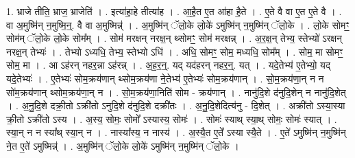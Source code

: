 \documentclass[17pt]{extarticle}
\begin{document}
1. भ्राजे तीति॒ भ्राज॒ भ्राजेति॑ । . इत्या॑हा॒हे तीत्या॑ह । . आ॒है॒त ए॒त आ॑हा है॒ते । . ए॒ते वै वा ए॒त ए॒ते वै । . वा अ॒मुष्मि॑न् न॒मुष्मि॒न्॒. वै वा अ॒मुष्मिन्न्॑ । . अ॒मुष्मि॑न् ॅलो॒के लो॒के॑ ऽमुष्मि॑न् न॒मुष्मि॑न् ॅलो॒के । . लो॒के सोमꣳ॒॒ सोम॑म् ॅलो॒के लो॒के सोम᳚म् । . सोम॑ मरक्षन् नरक्ष॒न् थ्सोमꣳ॒॒ सोम॑ मरक्षन्न् । . अ॒र॒क्ष॒न् तेभ्य॒ स्तेभ्यो॑ ऽरक्षन् नरक्ष॒न् तेभ्यः॑ । . तेभ्यो ऽध्यधि॒ तेभ्य॒ स्तेभ्यो ऽधि॑ । . अधि॒ सोमꣳ॒॒ सोम॒ मध्यधि॒ सोम᳚म् । . सोम॒ मा सोमꣳ॒॒ सोम॒ मा । . आ ऽह॑रन् नहर॒न्ना ऽह॑रन्न् । . अ॒ह॒र॒न्॒. यद् यद॑हरन् नहर॒न्॒. यत् । . यदे॒तेभ्य॑ ए॒तेभ्यो॒ यद् यदे॒तेभ्यः॑ । . ए॒तेभ्यः॑ सोम॒क्रय॑णान् थ्सोम॒क्रय॑णा ने॒तेभ्य॑ ए॒तेभ्यः॑ सोम॒क्रय॑णान् । . सो॒म॒क्रय॑णा॒न् न न सो॑म॒क्रय॑णान् थ्सोम॒क्रय॑णा॒न् न । . सो॒म॒क्रय॑णा॒निति॑ सोम - क्रय॑णान् । . नानु॑दि॒शे द॑नुदि॒शेन् न नानु॑दि॒शेत् । . अ॒नु॒दि॒शे दक्री॒तो ऽक्री॑तो ऽनुदि॒शे द॑नुदि॒शे दक्री॑तः । . अ॒नु॒दि॒शेदित्य॑नु - दि॒शेत् । . अक्री॑तो ऽस्या॒स्या क्री॒तो ऽक्री॑तो ऽस्य । . अ॒स्य॒ सोमः॒ सोमो᳚ ऽस्यास्य॒ सोमः॑ । . सोमः॑ स्याथ् स्या॒थ् सोमः॒ सोमः॑ स्यात् । . स्या॒न् न न स्या᳚थ् स्या॒न् न । . नास्या᳚स्य॒ न नास्य॑ । . अ॒स्यै॒त ए॒ते᳚ ऽस्या स्यै॒ते । . ए॒ते॑ ऽमुष्मि॑न् न॒मुष्मि॑न् ने॒त ए॒ते॑ ऽमुष्मिन्न्॑ । . अ॒मुष्मि॑न् ॅलो॒के लो॒के॑ ऽमुष्मि॑न् न॒मुष्मि॑न् ॅलो॒के । \newline
\end{document}

